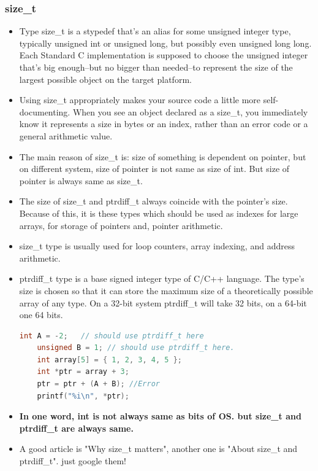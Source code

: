 \documentclass[a4paper,12pt,twoside]{book}
\begin{document}
\subsubsection{size\_t}
\begin{itemize}
	\item Type size\_t is a stypedef that's an alias for some unsigned integer type, typically unsigned int or unsigned long, but possibly even unsigned long long. Each Standard C implementation is supposed to choose the unsigned integer that's big enough--but no bigger than needed--to represent the size of the largest possible object on the target platform.
	
	\item Using size\_t appropriately makes your source code a little more self-documenting. When you see an object declared as a size\_t, you immediately know it represents a size in bytes or an index, rather than an error code or a general arithmetic value.
	
	\item The main reason of size\_t is: size of something is dependent on pointer, but on different system, size of pointer is not same as size of int.  But size of pointer is always same as size\_t.
	
	\item The size of size\_t and ptrdiff\_t always coincide with the pointer's size. Because of this, it is these types which should be used as indexes for large arrays, for storage of pointers and, pointer arithmetic.
	
	\item size\_t type is usually used for loop counters, array indexing, and address arithmetic.
	
	\item ptrdiff\_t type is a base signed integer type of C/C++ language. The type's size is chosen so that it can store the maximum size of a theoretically possible array of any type. On a 32-bit system ptrdiff\_t will take 32 bits, on a 64-bit one 64 bits.
	\begin{lstlisting}[frame=single, language=c++]
	int A = -2;   // should use ptrdiff_t here
	unsigned B = 1; // should use ptrdiff_t here.
	int array[5] = { 1, 2, 3, 4, 5 };
	int *ptr = array + 3;
	ptr = ptr + (A + B); //Error
	printf("%i\n", *ptr);
	\end{lstlisting}
	
	\item \textbf{In one word, int is not always same as bits of OS. but size\_t and ptrdiff\_t are always same.}
	
	\item A good article is "Why size\_t matters", another one is "About size\_t and ptrdiff\_t". just google them!   
	
	
\end{itemize}
\end{document}
